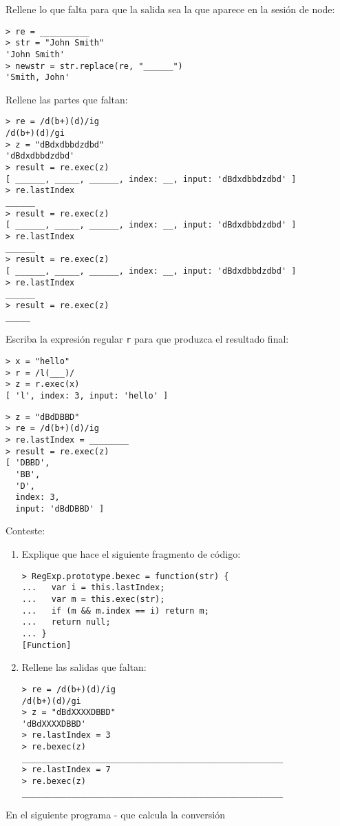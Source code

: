 \item Rellene lo que falta para que la salida sea la que aparece en la sesión de node:
\begin{verbatim}
> re = __________
> str = "John Smith"
'John Smith'
> newstr = str.replace(re, "______")
'Smith, John'
\end{verbatim}
\item  Rellene las partes que faltan:
\begin{verbatim}
> re = /d(b+)(d)/ig
/d(b+)(d)/gi
> z = "dBdxdbbdzdbd"
'dBdxdbbdzdbd'
> result = re.exec(z)
[ ______, _____, ______, index: __, input: 'dBdxdbbdzdbd' ]
> re.lastIndex
______
> result = re.exec(z)
[ ______, _____, ______, index: __, input: 'dBdxdbbdzdbd' ]
> re.lastIndex
______
> result = re.exec(z)
[ ______, _____, ______, index: __, input: 'dBdxdbbdzdbd' ]
> re.lastIndex
______
> result = re.exec(z)
_____
\end{verbatim}
\item Escriba la expresión regular \verb|r| para que produzca el resultado final:
\begin{verbatim}
> x = "hello"
> r = /l(___)/
> z = r.exec(x)
[ 'l', index: 3, input: 'hello' ]
\end{verbatim}
\item 
\begin{verbatim}
> z = "dBdDBBD"
> re = /d(b+)(d)/ig
> re.lastIndex = ________
> result = re.exec(z)
[ 'DBBD',
  'BB',
  'D',
  index: 3,
  input: 'dBdDBBD' ]
\end{verbatim}
\item  Conteste:
\begin{enumerate}
\item Explique que hace el siguiente fragmento de código:
\begin{verbatim}
> RegExp.prototype.bexec = function(str) {
...   var i = this.lastIndex;
...   var m = this.exec(str);
...   if (m && m.index == i) return m;
...   return null;
... }
[Function]
\end{verbatim}
\item Rellene las salidas que faltan:
\begin{verbatim}
> re = /d(b+)(d)/ig
/d(b+)(d)/gi
> z = "dBdXXXXDBBD"
'dBdXXXXDBBD'
> re.lastIndex = 3
> re.bexec(z)
_____________________________________________________
> re.lastIndex = 7
> re.bexec(z)
_____________________________________________________
\end{verbatim}
\end{enumerate}
\item  En el siguiente programa - que calcula la conversión
